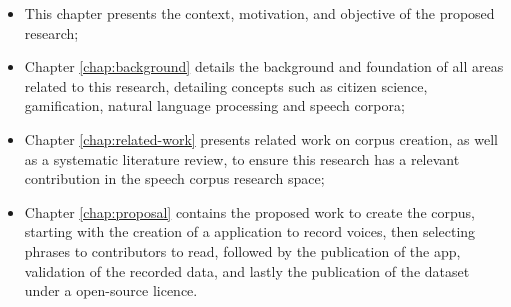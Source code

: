 \begin{itemize}
    \item This chapter presents the context, motivation, and objective of the proposed research;
    \item Chapter \ref{chap:background} details the background and foundation of all areas related to this research, detailing concepts such as citizen science, gamification, natural language processing and speech corpora;
    \item Chapter \ref{chap:related-work} presents related work on corpus creation, as well as a systematic literature review, to ensure this research has a relevant contribution in the speech corpus research space;
    \item Chapter \ref{chap:proposal} contains the proposed work to create the corpus, starting with the creation of a application to record voices, then selecting phrases to contributors to read, followed by the publication of the app, validation of the recorded data, and lastly the publication of the dataset under a open-source licence.
\end{itemize}
